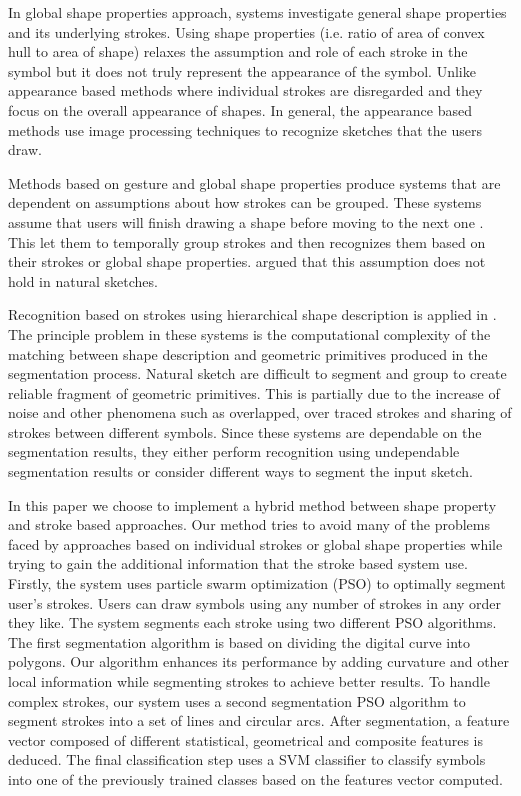 \documentclass{article}
\begin{document}
 In global shape properties approach, systems investigate general shape properties and its underlying strokes. Using shape properties (i.e. ratio of area of convex hull to area of shape) relaxes the assumption and role of each stroke in the symbol but it does not truly represent the appearance of the symbol\cite{DiagramOfflineConvexHull}. Unlike appearance based methods where individual strokes are disregarded and they focus on the overall appearance of shapes. In general, the  appearance based methods use image processing techniques to recognize sketches that the users draw. 
  
 Methods based on gesture and global shape properties produce systems that are dependent on assumptions about how strokes can be grouped. These systems assume that users will finish drawing a shape before moving to the next one \cite{Cali63,geometrydomain49}. This let them to temporally group strokes and then recognizes them based on their strokes or global shape properties. \cite{AlvaradoDigital} argued that this assumption does not hold in natural sketches.
 
 Recognition based on strokes using hierarchical shape description is applied in \cite{SketchRead2007}. The principle problem in these systems is the computational complexity of the matching between shape description and geometric primitives produced in the segmentation process. Natural sketch are difficult to segment and group to create reliable fragment of geometric primitives. This is partially due to the increase of noise and other phenomena such as overlapped, over traced strokes and sharing of strokes between different symbols. Since these systems are dependable on the segmentation results, they either perform recognition using undependable segmentation results or consider different ways to segment the input sketch. 
 
In this paper we choose to implement a hybrid method between shape property and stroke based approaches. Our method tries to avoid many of the problems faced by approaches based on individual strokes or global shape properties while trying to gain the additional information that the stroke based system use. Firstly, the system uses particle swarm optimization (PSO) to optimally segment user's strokes. Users can draw symbols using any number of strokes in any order they like. The system segments each stroke using two different PSO algorithms. The first segmentation algorithm is based on dividing the digital curve into polygons\cite{PolygonApproximationPSO}. Our algorithm enhances its performance by adding curvature and other local information while segmenting strokes to achieve better results. To handle complex strokes, our system uses a second segmentation PSO algorithm to segment strokes into a set of lines and circular arcs. After segmentation, a feature vector composed of different statistical, geometrical and composite features is deduced. The final classification step uses a SVM classifier to classify symbols into one of the previously trained classes based on the features vector computed.
\end{document}
